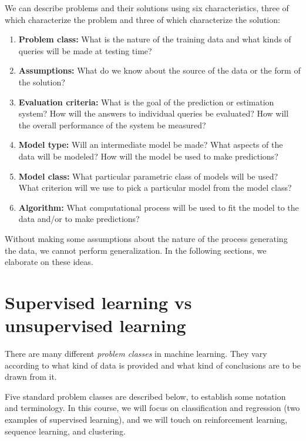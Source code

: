 \documentclass[11pt]{article}
\begin{document}
We can describe problems and their solutions using six
characteristics, three of which characterize the problem and three of
which characterize the solution:
\begin{enumerate}
\item {\bf Problem class:}  What is the nature of the training data and what
  kinds of queries will be made at testing time?
\item {\bf Assumptions:}  What do we know about the source of the data or the form of the solution?
\item {\bf Evaluation criteria:}  What is the goal of the prediction or estimation system?  How  will the answers to individual queries be evaluated?  How will the overall performance of the system be measured?
\item {\bf Model type:}  Will an intermediate model be made?  What aspects of the data will be modeled?  How will the model be used to make predictions?
\item {\bf Model class:} What particular parametric class of models
  will be used?  What criterion will we use to pick a particular model
  from the model class?
\item {\bf Algorithm:}  What computational process will be used to fit
  the model to the data and/or to make predictions?
\end{enumerate}
Without making some assumptions about the nature of the process
generating the data, we cannot perform generalization.  In the
following sections, we elaborate on these ideas.  



\section{Supervised learning vs unsupervised learning}


There are many different {\em problem classes} in machine learning.
They vary according to what kind of data is provided and what kind of
conclusions are to be drawn from it.  

Five standard problem classes are described below, to establish some notation and
terminology. In this course, we will focus on classification and regression (two
examples of supervised learning), and we will touch on reinforcement
learning, sequence learning, and clustering. 
\end{document}

